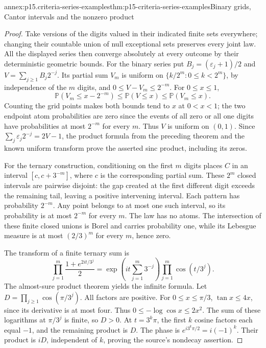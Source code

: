 \begin{annexitem}{annex:p15.criteria-series-examples}{thm:p15-criteria-series-examples}{Binary grids, Cantor intervals and the nonzero product}
\begin{proof}
Take versions of the digits valued in their indicated
finite sets everywhere; changing their countable union
of null exceptional sets preserves every joint law.
All the displayed series then converge absolutely at
every outcome by their deterministic geometric bounds.
For the binary series put \(B_j=(\varepsilon_j+1)/2\) and
\(V=\sum_{j\geq1}B_j2^{-j}\).
Its partial sum \(V_m\) is uniform on
\(\{k/2^m:0\leq k<2^m\}\), by independence of the \(m\)
digits, and \(0\leq V-V_m\leq2^{-m}\).
For \(0\leq x\leq1\),
\[
 \mathbb P(V_m\leq x-2^{-m})
       \leq\mathbb P(V\leq x)\leq\mathbb P(V_m\leq x).
\]
Counting the grid points makes both bounds tend to \(x\)
at \(0<x<1\); the two endpoint atom probabilities are
zero since the events of all zero or all one digits
have probabilities at most \(2^{-m}\) for every \(m\).
Thus \(V\) is uniform on \((0,1)\).
Since \(\sum_j\varepsilon_j2^{-j}=2V-1\), the product
formula from the preceding theorem and the known uniform
transform prove the asserted sinc product, including its zeros.

For the ternary construction, conditioning on the first
\(m\) digits places \(C\) in an interval
\([c,c+3^{-m}]\), where \(c\) is the corresponding partial
sum. These \(2^m\) closed intervals are pairwise disjoint:
the gap created at the first different digit exceeds the
remaining tail, leaving a positive intervening interval.
Each pattern has probability \(2^{-m}\).
Any point belongs to at most one such interval, so its
probability is at most \(2^{-m}\) for every \(m\).
The law has no atoms.
The intersection of these finite closed unions is Borel
and carries probability one, while its Lebesgue measure
is at most \((2/3)^m\) for every \(m\), hence zero.

The transform of a finite ternary sum is
\[
 \prod_{j=1}^m\frac{1+e^{2it/3^j}}2
       =\exp\!\left(it\sum_{j=1}^m3^{-j}\right)
                              \prod_{j=1}^m\cos(t/3^j).
\]
The almost-sure product theorem yields the infinite formula.
Let \(D=\prod_{j\geq1}\cos(\pi/3^j)\).
All factors are positive. For \(0\leq x\leq\pi/3\),
\(\tan x\leq4x\), since its derivative is at most four.
Thus \(0\leq-\log\cos x\leq2x^2\).
The sum of these logarithms at \(\pi/3^j\) is finite,
so \(D>0\).
At \(t=3^k\pi\), the first \(k\) cosine factors each
equal \(-1\), and the remaining product is \(D\).
The phase is \(e^{i3^k\pi/2}=i(-1)^k\).
Their product is \(iD\), independent of \(k\), proving
the source's nondecay assertion.
\end{proof}
\end{annexitem}

